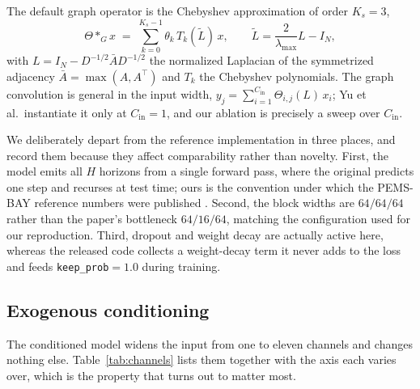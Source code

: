\documentclass[letterpaper]{article}
\begin{document}
The default graph operator is the Chebyshev approximation of order $K_s=3$,
\begin{equation}
\Theta *_{G} x \;=\; \sum_{k=0}^{K_s-1}\theta_k\,T_k(\tilde{L})\,x,
\qquad
\tilde{L}=\frac{2}{\lambda_{\max}}L-I_N ,
\end{equation}
with $L=I_N-D^{-1/2}\bar{A}D^{-1/2}$ the normalized Laplacian of the symmetrized adjacency $\bar A=\max(A,A^{\!\top})$ and $T_k$ the Chebyshev polynomials. The graph convolution is general in the input width, $y_j=\sum_{i=1}^{C_{\text{in}}}\Theta_{i,j}(L)\,x_i$; Yu et al.\ instantiate it only at $C_{\text{in}}=1$, and our ablation is precisely a sweep over $C_{\text{in}}$.

We deliberately depart from the reference implementation in three places, and record them because they affect comparability rather than novelty. First, the model emits all $H$ horizons from a single forward pass, where the original predicts one step and recurses at test time; ours is the convention under which the PEMS-BAY reference numbers were published \cite{wu2019graphwavenet}. Second, the block widths are $64/64/64$ rather than the paper's bottleneck $64/16/64$, matching the configuration used for our reproduction. Third, dropout and weight decay are actually active here, whereas the released code collects a weight-decay term it never adds to the loss and feeds \texttt{keep\_prob}$=1.0$ during training.

\subsection{Exogenous conditioning}

The conditioned model widens the input from one to eleven channels and changes nothing else. Table~\ref{tab:channels} lists them together with the axis each varies over, which is the property that turns out to matter most.
\end{document}
